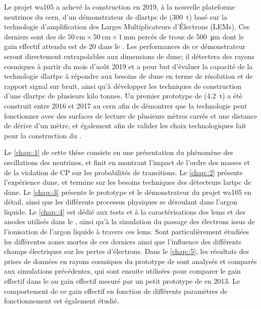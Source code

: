 Le projet \gls{wa105} a achevé la construction en 2019, à la nouvelle plateforme neutrinos du \gls{cern}, d'un démonstrateur de \gls{dlartpc} de \SSS{} (\SI{300}{\tonne}) basé sur la technologie d'amplification des Larges Multiplicateurs d’Électrons (LEMs). Ces derniers sont des  de $\SI{50}{\centi\meter}\times\SI{50}{\centi\meter}\times\SI{1}{\milli\meter}$ percés de trous de \SI{500}{\micro\meter} dont le gain effectif attendu est de 20 dans le \SSS{}. Les performances de ce démonstrateur seront directement extrapolables aux dimensions de \gls{dune}; il détectera des rayons cosmiques à partir du mois d'août 2019 et a pour but d'évaluer la capacité de la technologie \gls{dlartpc} à répondre aux besoins de \gls{dune} en terme de résolution et de rapport signal sur bruit, ainsi qu'à développer les techniques de construction d'une \gls{dlartpc} de plusieurs kilo tonnes. Un premier prototype de \TOO{} (\SI{4.2}{\tonne}) a été construit entre 2016 et 2017 au \gls{cern} afin de démontrer que la technologie peut fonctionner avec des surfaces de lecture de plusieurs mètres carrés et une distance de dérive d'un mètre, et également afin de valider les choix technologiques fait pour la construction du \SSS{}.

Le \autoref{chap::1} de cette thèse consiste en une présentation du phénomène des oscillations des neutrinos, et finit en montrant l'impact de l'ordre des masses et de la violation de CP sur les probabilités de transitions. Le \autoref{chap::2} présente l'expérience \gls{dune}, et termine sur les besoins techniques des détecteurs \gls{lartpc} de \gls{dune}. Le \autoref{chap::3} présente le prototype et le démonstrateur du projet \gls{wa105} en détail, ainsi que les différents processus physiques se déroulant dans l'argon liquide. Le \autoref{chap::4} est dédié aux tests et à la caractérisations des \glspl{lem} et des anodes utilisés dans le \SSS{}, ainsi qu'à la simulation du passage des électrons issus de l'ionisation de l'argon liquide à travers ces \glspl{lem}. Sont particulièrement étudiées les différentes zones mortes de ces derniers ainsi que l'influence des différents champs électriques sur les pertes d'électrons.  Dans le \autoref{chap::5}, les résultats des prises de données en rayons cosmiques du prototype de \TOO{} sont analysés et comparés aux simulations précédentes, qui sont ensuite utilisées pour comparer le gain effectif dans le \TOO{} au gain effectif mesuré par un petit prototype de \threeL{} en 2013. Le comportement de ce gain effectif en fonction de différents paramètres de fonctionnement est également étudié.


